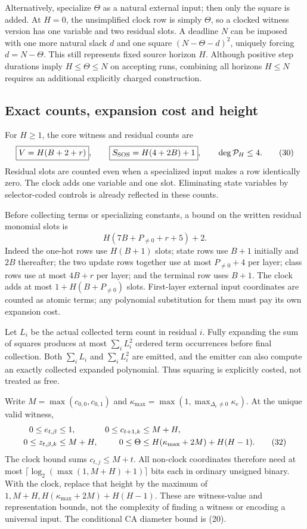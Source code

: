 Alternatively, specialize $\Theta$ as a natural external input; then only
the square is added. At $H=0$, the unsimplified clock row is simply $\Theta$,
so a clocked witness version has one variable and two residual slots. A deadline
$N$ can be imposed with one more natural slack $d$ and one square
$(N-\Theta-d)^2$, uniquely forcing $d=N-\Theta$. This still represents fixed
source horizon $H$. Although positive step durations imply $H\le\Theta\le N$
on accepting runs, combining all horizons $H\le N$ requires an additional
explicitly charged construction.

\subsection{Exact counts, expansion cost and height}
For $H\ge1$, the core witness and residual counts are
\[
 \boxed{V=H(B+2+r)},\qquad
 \boxed{S_{\rm SOS}=H(4+2B)+1},\qquad \deg\mathcal P_H\le4.          \tag{30}
\]
Residual slots are counted even when a specialized input makes a row
identically zero. The clock adds one variable and one slot. Eliminating state
variables by selector-coded controls is already reflected in these counts.

Before collecting terms or specializing constants, a bound on the written
residual monomial slots is
\[
                 H(7B+P_{\ne0}+r+5)+2.                            \tag{31}
\]
Indeed the one-hot rows use $H(B+1)$ slots; state rows use $B+1$ initially
and $2B$ thereafter; the two update rows together use at most $P_{\ne0}+4$
per layer; class rows use at most $4B+r$ per layer; and the terminal row uses
$B+1$. The clock adds at most $1+H(B+P_{\ne0})$ slots. First-layer external
input coordinates are counted as atomic terms; any polynomial substitution
for them must pay its own expansion cost.

Let $L_i$ be the actual collected term count in residual $i$. Fully expanding
the sum of squares produces at most $\sum_iL_i^2$ ordered term occurrences
before final collection. Both $\sum_iL_i$ and $\sum_iL_i^2$ are emitted, and
the emitter can also compute an exactly collected expanded polynomial. Thus
squaring is explicitly costed, not treated as free.

Write $M=\max(c_{0,0},c_{0,1})$ and
$\kappa_{\max}=\max(1,\max_{\Delta_e\ne0}\kappa_e)$. At the unique valid
witness,
\begin{align}
 0\le e_{t,\beta}&\le1,& 0\le c_{t+1,k}&\le M+H,\notag\\
 0\le z_{t,\beta,k}&\le M+H,&
 0\le\Theta&\le H(\kappa_{\max}+2M)+H(H-1).             \tag{32}
\end{align}
The clock bound sums $c_{t,j}\le M+t$. All non-clock coordinates therefore
need at most $\lceil\log_2(\max(1,M+H)+1)\rceil$ bits each in ordinary
unsigned binary. With the clock, replace that height by the maximum of
$1,M+H,H(\kappa_{\max}+2M)+H(H-1)$. These are witness-value and representation
bounds, not the complexity of finding a witness or encoding a universal input.
The conditional CA diameter bound is (20).

